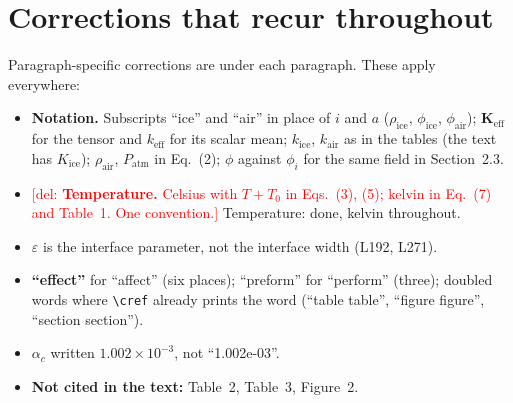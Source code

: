 \documentclass[11pt]{article}
\newcommand{\add}[1]{\textcolor{revA}{#1}}
\newcommand{\del}[1]{\textcolor{red}{[del: #1]}}
\newcommand{\cref}[1]{Figure~\texttt{\detokenize{#1}}}
\begin{document}
\section*{Corrections that recur throughout}
Paragraph-specific corrections are under each paragraph. These apply
everywhere:
\begin{itemize}
\item \textbf{Notation.} Subscripts ``ice'' and ``air'' in place of $i$ and
  $a$ ($\rho_{\mathrm{ice}}$, $\phi_{\mathrm{ice}}$, $\phi_{\mathrm{air}}$);
  $\mathbf{K}_{\mathrm{eff}}$ for the tensor and $k_{\mathrm{eff}}$ for its
  scalar mean; $k_{\mathrm{ice}}$, $k_{\mathrm{air}}$ as in the tables (the
  text has $K_{\mathrm{ice}}$); $\rho_{\mathrm{air}}$, $P_{\mathrm{atm}}$ in
  Eq.~(2); $\phi$ against $\phi_i$ for the same field in Section~2.3.
\item \del{\textbf{Temperature.} Celsius with $T + T_0$ in Eqs.~(3), (5); kelvin
  in Eq.~(7) and Table~1. One convention.} \add{Temperature: done, kelvin throughout.}
\item \textbf{$\varepsilon$} is the interface parameter, not the interface
  width (L192, L271).
\item \textbf{``effect''} for ``affect'' (six places); ``preform'' for
  ``perform'' (three); doubled words where \verb|\cref| already prints the
  word (``table table'', ``figure figure'', ``section section'').
\item \textbf{$\alpha_c$} written $1.002\times10^{-3}$, not ``1.002e-03''.
\item \textbf{Not cited in the text:} Table~2, Table~3, Figure~2.
\end{itemize}
\end{document}
